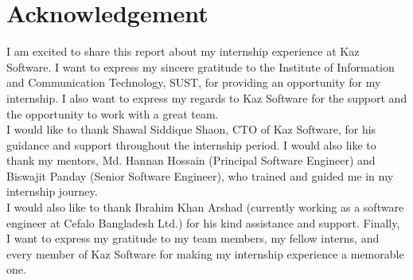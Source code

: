 \chapter*{Acknowledgement}

I am excited to share this report about my internship experience at Kaz Software.
I want to express my sincere gratitude to the Institute of Information and Communication Technology, SUST, for providing an opportunity for my internship.
I also want to express my regards to Kaz Software for the support and the opportunity to work with a great team.\\

I would like to thank Shawal Siddique Shaon, CTO of Kaz Software, for his guidance and support throughout the internship period.
I would also like to thank my mentors, Md. Hannan Hossain (Principal Software Engineer) and Biswajit Panday (Senior Software Engineer), who trained and guided me in my internship journey.\\

I would also like to thank Ibrahim Khan Arshad (currently working as a software engineer at Cefalo Bangladesh Ltd.) for his kind assistance and support.
Finally, I want to express my gratitude to my team members, my fellow interns, and every member of Kaz Software for making my internship experience a memorable one.